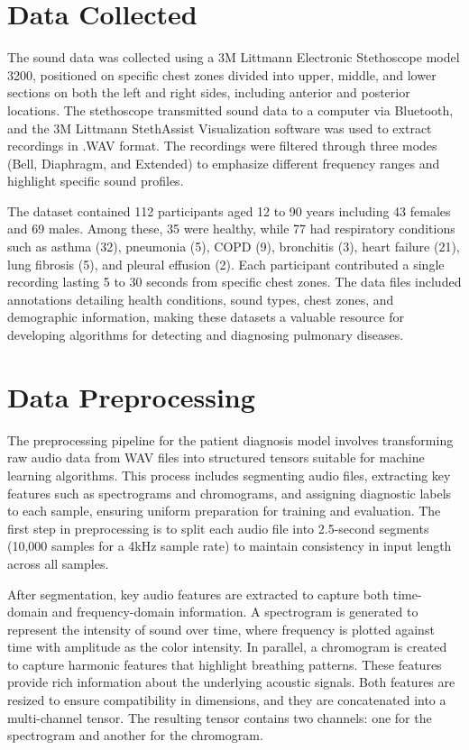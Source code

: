 \documentclass[twocolumn]{article}
\begin{document}
 \section{Data Collected}  
The sound data was collected using a 3M Littmann Electronic Stethoscope model 3200, positioned on specific chest zones divided into upper, middle, and lower sections on both the left and right sides, including anterior and posterior locations. The stethoscope transmitted sound data to a computer via Bluetooth, and the 3M Littmann  StethAssist Visualization software was used to extract recordings in .WAV format. The recordings were filtered through three modes (Bell, Diaphragm, and Extended) to emphasize different frequency ranges and highlight specific sound profiles.

The dataset contained 112 participants aged 12 to 90 years including 43 females and 69 males. Among these, 35 were healthy, while 77 had respiratory conditions such as asthma (32), pneumonia (5), COPD (9), bronchitis (3), heart failure (21), lung fibrosis (5), and pleural effusion (2). Each participant contributed a single recording lasting 5 to 30 seconds from specific chest zones. The data files included annotations detailing health conditions, sound types, chest zones, and demographic information, making these datasets a valuable resource for developing algorithms for detecting and diagnosing pulmonary diseases.


\section{Data Preprocessing} 
The preprocessing pipeline for the patient diagnosis model involves transforming raw audio data from WAV files into structured tensors suitable for machine learning algorithms. This process includes segmenting audio files, extracting key features such as spectrograms and chromograms, and assigning diagnostic labels to each sample, ensuring uniform preparation for training and evaluation. The first step in preprocessing is to split each audio file into 2.5-second segments (10,000 samples for a 4kHz sample rate) to maintain consistency in input length across all samples.

After segmentation, key audio features are extracted to capture both time-domain and frequency-domain information. A spectrogram is generated to represent the intensity of sound over time, where frequency is plotted against time with amplitude as the color intensity. In parallel, a chromogram is created to capture harmonic features that highlight breathing patterns. These features provide rich information about the underlying acoustic signals. Both features are resized to ensure compatibility in dimensions, and they are concatenated into a multi-channel tensor. The resulting tensor contains two channels: one for the spectrogram and another for the chromogram.
\end{document}
